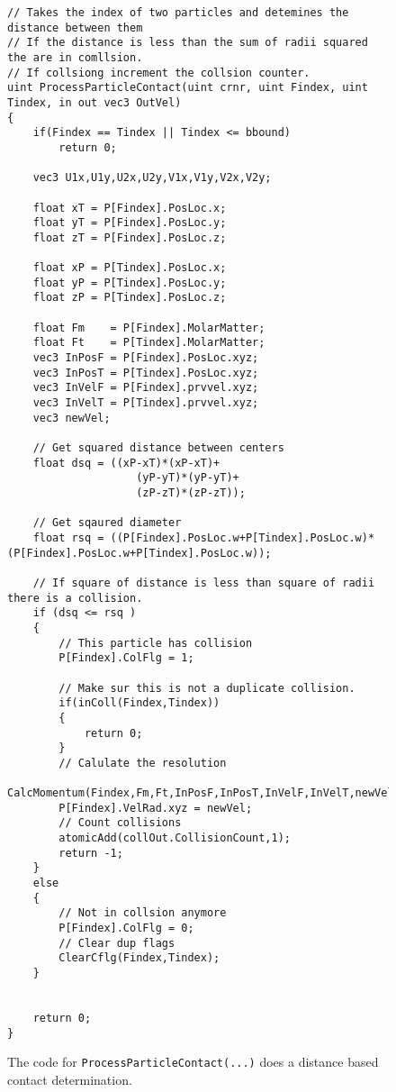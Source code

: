 
\begin{figure}[h]
\centering
\lstset{style=gpucode,linewidth=6.5in,xleftmargin=0.25in}

\begin{lstlisting}
// Takes the index of two particles and detemines the distance between them
// If the distance is less than the sum of radii squared the are in comllsion.
// If collsiong increment the collsion counter.
uint ProcessParticleContact(uint crnr, uint Findex, uint Tindex, in out vec3 OutVel)
{
	if(Findex == Tindex || Tindex <= bbound)
		return 0;
	
	vec3 U1x,U1y,U2x,U2y,V1x,V1y,V2x,V2y;

	float xT = P[Findex].PosLoc.x;
    float yT = P[Findex].PosLoc.y;
    float zT = P[Findex].PosLoc.z;
	
	float xP = P[Tindex].PosLoc.x;
    float yP = P[Tindex].PosLoc.y;
    float zP = P[Tindex].PosLoc.z;
	
	float Fm 	= P[Findex].MolarMatter;
	float Ft 	= P[Tindex].MolarMatter;
	vec3 InPosF = P[Findex].PosLoc.xyz;
	vec3 InPosT = P[Tindex].PosLoc.xyz;
	vec3 InVelF	= P[Findex].prvvel.xyz;
	vec3 InVelT	= P[Tindex].prvvel.xyz;
	vec3 newVel;
	
    // Get squared distance between centers
    float dsq = ((xP-xT)*(xP-xT)+
                    (yP-yT)*(yP-yT)+
                    (zP-zT)*(zP-zT));
   
	// Get sqaured diameter
	float rsq = ((P[Findex].PosLoc.w+P[Tindex].PosLoc.w)*(P[Findex].PosLoc.w+P[Tindex].PosLoc.w));
	
	// If square of distance is less than square of radii there is a collision.
	if (dsq <= rsq )
    {
		// This particle has collision
		P[Findex].ColFlg = 1;
		
		// Make sur this is not a duplicate collision.
		if(inColl(Findex,Tindex))
		{
			return 0;
		}
		// Calulate the resolution
		CalcMomentum(Findex,Fm,Ft,InPosF,InPosT,InVelF,InVelT,newVel);
		P[Findex].VelRad.xyz = newVel;
		// Count collisions
		atomicAdd(collOut.CollisionCount,1);
		return -1;		
	}
	else
	{
		// Not in collsion anymore
		P[Findex].ColFlg = 0;
		// Clear dup flags
		ClearCflg(Findex,Tindex);
	}


	return 0;
}
\end{lstlisting}


\caption[Benchset test configuration file]{The code for \texttt{ProcessParticleContact(...)} does a distance based contact determination. }
\label{fig:ProcessParticleContact}
\end{figure}
